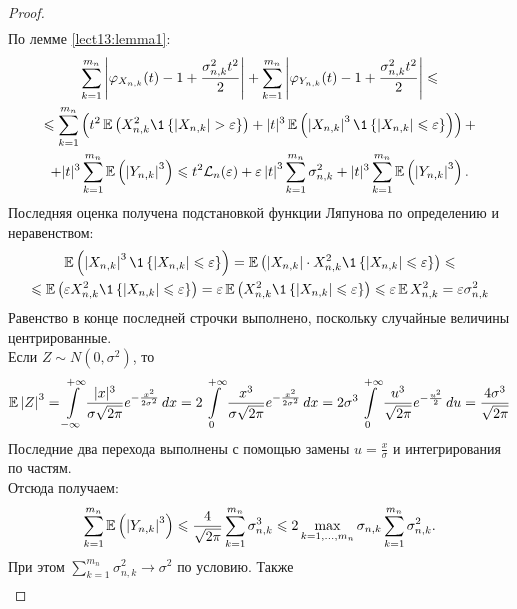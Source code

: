 \begin{proof}
\begin{multline*}
\end{multline*}
По лемме \ref{lect13:lemma1}:
\begin{multline*}
\sum_{k = 1}^{m_n}\left|\phi_{X_{n, k}}(t) - 1 + \frac{\sigma_{n, k}^2t^2}{2}\right| + \sum_{k = 1}^{m_n}\left|\phi_{Y_{n, k}}(t)  - 1 + \frac{\sigma_{n, k}^2t^2}{2}\right| \leqslant 
\\
\leqslant \sum_{k = 1}^{m_n}\left(t^2\E\left(X_{n, k}^2 \1\left\{\left|X_{n, k}\right| > \eps\right\}\right) + |t|^3\E\left(\left|X_{n, k}\right|^3 \1\left\{\left|X_{n, k}\right| \leqslant \eps\right\}\right)\right) + 
\\
 + |t|^3\sum_{k = 1}^{m_n}\E\left(\left|Y_{n, k}\right|^3\right)
\leqslant t^2\mathcal{L}_n(\eps) + \eps\left|t\right|^3\sum_{k = 1}^{m_n}\sigma_{n, k}^2 + |t|^3\sum_{k = 1}^{m_n}\E\left(\left|Y_{n, k}\right|^3\right).
\end{multline*}
Последняя оценка получена подстановкой функции Ляпунова по определению и неравенством:
\begin{multline*}
\E\left(\left|X_{n, k}\right|^3 \1\left\{\left|X_{n, k}\right| \leqslant \eps\right\}\right) = \E\left(\left|X_{n, k}\right| \cdot X_{n, k} ^2 \1\left\{\left|X_{n, k}\right| \leqslant \eps\right\}\right) \leqslant
\\
\leqslant \E\left(\eps X_{n, k} ^2 \1\left\{\left|X_{n, k}\right| \leqslant \eps\right\}\right) = \eps\E\left(X_{n, k} ^2 \1\left\{\left|X_{n, k}\right| \leqslant \eps\right\}\right) \leqslant \eps\E X_{n, k} ^2 = \eps\sigma_{n, k}^2
\end{multline*}
Равенство в конце последней строчки выполнено, поскольку случайные величины центрированные.\\
Если $Z \sim N(0, \sigma^2)$, то 
$$
\operatorname*{\mathbb{E}}\left|Z\right|^3 = \int\limits_{-\infty}^{+\infty}\frac{|x|^3}{\sigma\sqrt{2\pi}}e^{-\frac{x^2}{2\sigma^2}}\,dx = 2 \int\limits_{0}^{+\infty}\frac{x^3}{\sigma\sqrt{2\pi}}e^{-\frac{x^2}{2\sigma^2}}\,dx =  2 \sigma^3\int\limits_{0}^{+\infty}\frac{u^3}{\sqrt{2\pi}}e^{-\frac{u^2}{2}}\,du = \frac{4\sigma^3}{\sqrt{2\pi}}
$$
Последние два перехода выполнены с помощью замены $u = \frac{x}{\sigma}$ и интегрирования по частям.\\
Отсюда получаем:
$$
\sum_{k = 1}^{m_n}\operatorname*{\mathbb{E}}\left(\left|Y_{n, k}\right|^3\right) \leqslant \frac{4}{\sqrt{2\pi}}\sum_{k = 1}^{m_n}\sigma_{n, k}^3 \leqslant 2\max_{k = 1, \ldots, m_n}\sigma_{n, k}\sum_{k = 1}^{m_n}\sigma_{n, k}^2.
$$
При этом $\sum\limits_{k = 1}^{m_n}\sigma_{n, k}^2 \to \sigma^2$ по условию. Также 
\begin{multline*}

\end{multline*}
\end{proof}

